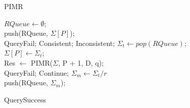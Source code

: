 \IncMargin{1em}
\begin{algorithm}\label{alg_prqa}
	{\small
			\caption{PIMR}
			$RQueue \leftarrow \emptyset$;\\
			push(RQueue, $\Sigma[P]$);\\
			{
				 {
					{
						{
							\Return QueryFail;
						}
						\Return Consistent;
					}
					\Return Inconsistent;
				}
				$\Sigma_t \leftarrow pop(RQueue)$;\\
				$\Sigma[P] \leftarrow \Sigma_t$;\\
				
				Res $\leftarrow$ PIMR($\Sigma$, P + 1, D, q);\\
				{
					\Return QueryFail;
				}
				{
					Continue;
				}
				{
					$\Sigma_m \leftarrow \Sigma_t / r$\\
					push(RQueue, $\Sigma_m$);\\
				}  
			}
			
			\Return QuerySuccess
	}
	\vspace*{-1mm}
\end{algorithm}
\DecMargin{1em}
